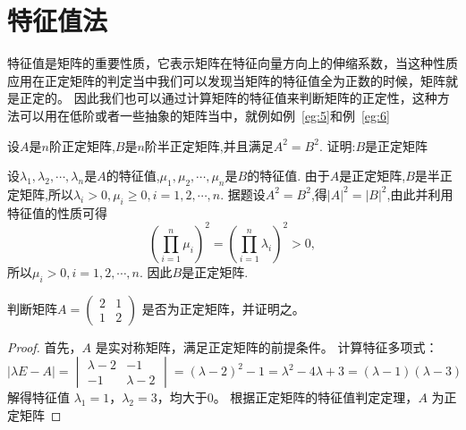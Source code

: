 \section{特征值法}
特征值是矩阵的重要性质，它表示矩阵在特征向量方向上的伸缩系数，当这种性质应用在正定矩阵的判定当中我们可以发现当矩阵的特征值全为正数的时候，矩阵就是正定的。
因此我们也可以通过计算矩阵的特征值来判断矩阵的正定性，这种方法可以用在低阶或者一些抽象的矩阵当中，就例如例~\ref{eg:5}和例~\ref{eg:6}
\begin{example}\label{eg:5}
  设$A$是$n$阶正定矩阵,$B$是$n$阶半正定矩阵,并且满足$A^2=B^2$.
  证明:$B$是正定矩阵
\end{example}
\begin{solution}
  设$\lambda_1,\lambda_2,\cdots,\lambda_n$是$A$的特征值,$\mu_1,\mu_2,\cdots,\mu_n$是$B$的特征值.
    由于$A$是正定矩阵,$B$是半正定矩阵,所以$\lambda_i>0,\mu_i\ge0,i=1,2,\cdots,n$.
    据题设$A^2=B^2$,得$|A|^2=|B|^2$,由此并利用特征值的性质可得
    \[
    \left(\prod_{i=1}^n \mu_i\right)^2 = \left(\prod_{i=1}^n \lambda_i\right)^2 > 0,
    \]
    所以$\mu_i>0,i=1,2,\cdots,n$. 因此$B$是正定矩阵.
\end{solution}
\begin{example}\label{eg:6}
  判断矩阵$A=\begin{pmatrix} 2 & 1 \\ 1 & 2 \end{pmatrix}$ 是否为正定矩阵，并证明之。
\end{example}
\begin{proof}
  首先，$A$ 是实对称矩阵，满足正定矩阵的前提条件。
计算特征多项式：
\[
|\lambda E - A| = \begin{vmatrix} \lambda - 2 & -1 \\ -1 & \lambda - 2 \end{vmatrix} 
= (\lambda - 2)^2 - 1 = \lambda^2 - 4\lambda + 3 = (\lambda - 1)(\lambda - 3)
\]
解得特征值 $\lambda_1 = 1$，$\lambda_2 = 3$，均大于0。
根据正定矩阵的特征值判定定理，$A$ 为正定矩阵
\end{proof}
